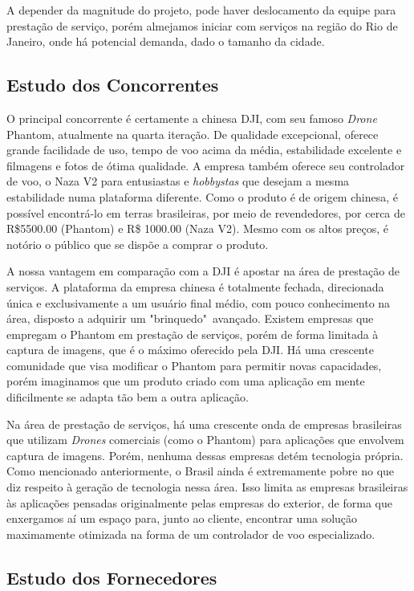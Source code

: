 A depender da magnitude do projeto, pode haver deslocamento da equipe para prestação de serviço, porém almejamos iniciar com serviços na região do Rio de Janeiro, onde há potencial demanda, dado o tamanho da cidade.

\subsection{Estudo dos Concorrentes}

O principal concorrente é certamente a chinesa DJI, com seu famoso \emph{Drone} Phantom, atualmente na quarta iteração. De qualidade excepcional, oferece grande facilidade de uso, tempo de voo acima da média, estabilidade excelente e filmagens e fotos de ótima qualidade. A empresa também oferece seu controlador de voo, o Naza V2 para entusiastas e \emph{hobbystas} que desejam a mesma estabilidade numa plataforma diferente. Como o produto é de origem chinesa, é possível encontrá-lo em terras brasileiras, por meio de revendedores, por cerca de R\$5500.00 (Phantom) e R\$ 1000.00 (Naza V2). Mesmo com os altos preços, é notório o público que se dispõe a comprar o produto.

A nossa vantagem em comparação com a DJI é apostar na área de prestação de serviços. A plataforma da empresa chinesa é totalmente fechada, direcionada única e exclusivamente a um usuário final médio, com pouco conhecimento na área, disposto a adquirir um "brinquedo"\ avançado. Existem empresas que empregam o Phantom em prestação de serviços, porém de forma limitada à captura de imagens, que é o máximo oferecido pela DJI. Há uma crescente comunidade que visa modificar o Phantom para permitir novas capacidades, porém imaginamos que um produto criado com uma aplicação em mente dificilmente se adapta tão bem a outra aplicação.

Na área de prestação de serviços, há uma crescente onda de empresas brasileiras que utilizam \emph{Drones} comerciais (como o Phantom) para aplicações que envolvem captura de imagens. Porém, nenhuma dessas empresas detém tecnologia própria. Como mencionado anteriormente, o Brasil ainda é extremamente pobre no que diz respeito à geração de tecnologia nessa área. Isso limita as empresas brasileiras às aplicações pensadas originalmente pelas empresas do exterior, de forma que enxergamos aí um espaço para, junto ao cliente, encontrar uma solução maximamente otimizada na forma de um controlador de voo especializado. 

\subsection{Estudo dos Fornecedores}

